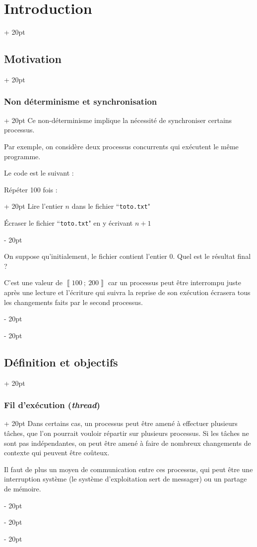 \documentclass[a4paper, 12pt, twoside]{article}
\newcommand{\nset}[2]{\left\llbracket #1\ ;\ #2 \right\rrbracket}
\newcommand{\ind}[1][20pt]{\advance\leftskip + #1}
\newcommand{\deind}[1][20pt]{\advance\leftskip - #1}
\newenvironment{indt}[2][20pt]{#2 \par \ind[#1]}{\par \deind} %
\begin{document}
\begin{indt}{\section{Introduction}}
\begin{indt}{\subsection{Motivation}}
\begin{indt}{\subsubsection{Non déterminisme et synchronisation}}
                Ce non-déterminisme implique la nécessité de synchroniser certains processus.

                \vspace{6pt}
                
                Par exemple, on considère deux processus concurrents qui exécutent le même programme.

                Le code est le suivant :

                \begin{pseudocode}
                    \begin{indt}{Répéter 100 fois :}
                        Lire l'entier $n$ dans le fichier ``\texttt{toto.txt}"

                        Écraser le fichier ``\texttt{toto.txt}" en y écrivant $n + 1$
                    \end{indt}
                \end{pseudocode}

                On suppose qu'initialement, le fichier contient l'entier $0$.
                Quel est le résultat final ?

                C'est une valeur de $\nset{100}{200}$ car un processus peut être interrompu juste après une lecture et l'écriture qui suivra la reprise de son exécution écrasera tous les changements faits par le second processus.
            \end{indt}
        \end{indt}

        \vspace{12pt}
        
        \begin{indt}{\subsection{Définition et objectifs}}
            \begin{indt}{\subsubsection{Fil d'exécution (\textit{thread})}}
                Dans certains cas, un processus peut être amené à effectuer plusieurs tâches, que l'on pourrait vouloir répartir sur plusieurs processus.
                Si les tâches ne sont pas indépendantes, on peut être amené à faire de nombreux changements de contexte qui peuvent être coûteux.

                Il faut de plus un moyen de communication entre ces processus, qui peut être une interruption système (le système d'exploitation sert de messager) ou un partage de mémoire.


\end{indt}
\end{indt}
\end{indt}
\end{document}

